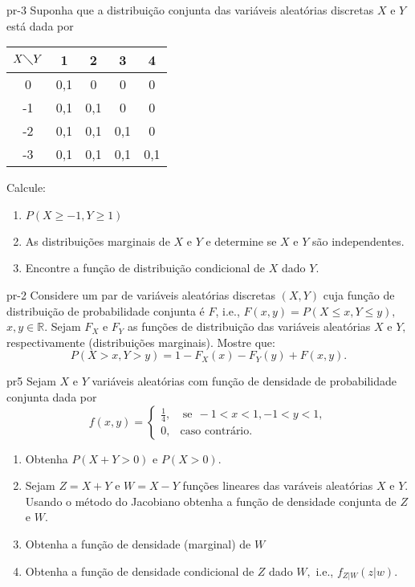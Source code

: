 \begin{problema}{}{pr-3}
Suponha que a distribuição conjunta das variáveis aleatórias discretas $X$ e $Y$ está dada por
\begin{center}
	\begin{tabular}{|c|c|c|c|c|} \hline
		$X \diagdown Y$ & 1 & 2 & 3 & 4 \\ \hline
		0 & 0,1 & 0 & 0 & 0 \\ \hline
		-1 & 0,1 & 0,1 & 0 & 0 \\ \hline
		-2 & 0,1 & 0,1 & 0,1 & 0 \\ \hline
		-3 & 0,1 & 0,1 & 0,1 & 0,1 \\ \hline
	\end{tabular}
\end{center}
Calcule:
\begin{enumerate}
	\item $ P(X \geq -1, Y \geq 1) $
	\item As distribuições marginais de $X$ e $Y$ e determine se $X$ e $Y$ são independentes.
	\item Encontre a função de distribuição condicional de $X$ dado $Y.$
\end{enumerate}
%
\end{problema}



\begin{problema}{}{pr-2}
	Considere um par de variáveis aleatórias discretas $(X, Y)$ cuja função de distribuição de probabilidade conjunta é $F$, i.e., $F(x,y)=P(X\leq x, Y\leq y),$ $x,y \in \mathbb{R}.$ Sejam $F_X$ e $F_Y$ as funções de distribuição das variáveis aleatórias $X$ e $Y,$ respectivamente (distribuições marginais). Mostre que: $$P(X>x, Y>y)= 1-F_X(x)-F_Y(y)+F(x,y).$$ 	
\end{problema}




\begin{problema}{}{pr5}
Sejam $X$ e $Y$ variáveis aleatórias com função de densidade de probabilidade conjunta dada por 
$$ f(x,y) = 
\begin{cases}
	\frac{1}{4}, & \ \text{se} \  \  -1<x<1,  -1<y<1, \\
	0, &  \text{caso contrário.}
\end{cases}
$$

\begin{enumerate}
	\item  Obtenha $P(X+Y> 0)$ e $P(X>0).$
	\item Sejam $Z=X+Y$ e $W=X-Y$ funções lineares das varáveis aleatórias $X$ e $Y.$ Usando o método do Jacobiano obtenha a função de densidade conjunta de $Z$ e $W.$
		\item Obtenha a função de densidade (marginal) de $W$ 
	\item  Obtenha a função de densidade condicional de $Z$ dado $W,$ i.e., $f_{Z|W}(z|w).$
\end{enumerate}
\end{problema}




